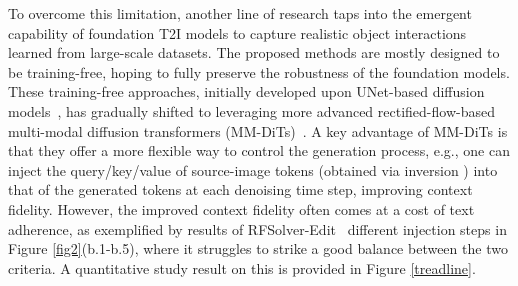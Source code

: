 \documentclass{article}
\begin{document}
To overcome this limitation, another line of research taps into the emergent capability of foundation T2I models to capture realistic object interactions learned from large-scale datasets.
The proposed methods are mostly designed to be training-free, hoping to fully preserve the robustness of the foundation models.
{These training-free approaches, initially developed upon UNet-based diffusion models~\citep{hertz2022prompt, cao2023masactrl, tumanyan2023plug}, has gradually shifted to leveraging more advanced rectified-flow-based multi-modal diffusion transformers (MM-DiTs)~\citep{rout2024semantic, wang2024taming, deng2024fireflow, tewel2025addit, zhu2025kv}.
A key advantage of MM-DiTs is that they offer a more flexible way to control the generation process, e.g., one can inject the query/key/value of source-image tokens (obtained via inversion \citep{deng2024fireflow,rout2024semantic,wang2024taming}) into that of the generated tokens at each denoising time step, improving context fidelity.}
{However, the improved context fidelity often comes at a cost of text adherence, as exemplified by results of RFSolver-Edit~\citep{wang2024taming} different injection steps in  Figure \ref{fig2}(b.1-b.5), where it struggles to strike a good balance between the two criteria. A quantitative study result on this is provided in Figure \ref{treadline}.}
\end{document}
